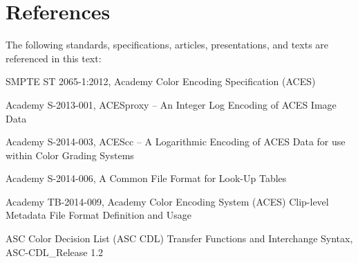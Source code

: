 \numberedformat
\chapter{References}
The following standards, specifications, articles, presentations, and texts are referenced in this text:

SMPTE ST 2065-1:2012, Academy Color Encoding Specification (ACES)

Academy S-2013-001, ACESproxy -- An Integer Log Encoding of ACES Image Data

Academy S-2014-003, ACEScc -- A Logarithmic Encoding of ACES Data for use within Color Grading Systems

Academy S-2014-006, A Common File Format for Look-Up Tables

Academy TB-2014-009, Academy Color Encoding System (ACES) Clip-level Metadata File Format Definition and Usage

ASC Color Decision List (ASC CDL) Transfer Functions and Interchange Syntax, ASC-CDL\_Release 1.2
